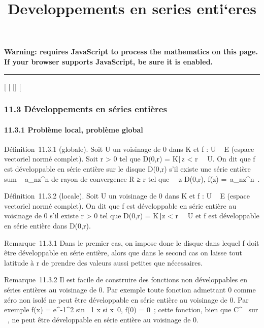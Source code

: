 \documentclass[]{article}
\title{Developpements en series enti`eres}
\author{}
\date{}
\begin{document}
\maketitle

\textbf{Warning: 
requires JavaScript to process the mathematics on this page.\\ If your
browser supports JavaScript, be sure it is enabled.}

\begin{center}\rule{3in}{0.4pt}\end{center}

[
[
[]
[

\subsubsection{11.3 Développements en séries entières}

\paragraph{11.3.1 Problème local, problème global}

Définition~11.3.1 (globale). Soit U un voisinage de 0 dans K et f : U \rightarrow~
E (espace vectoriel normé complet). Soit r > 0 tel que
D(0,r) = \z \in
K∣z <
r\ \subset~ U. On dit que f est développable en série entière
sur le disque D(0,r) s'il existe une série entière
\\sum ~
a_nz^n de rayon de convergence R ≥ r tel que
\forall~~z \in D(0,r), f(z) =\
\sum  a_nz^n~.

Définition~11.3.2 (locale). Soit U un voisinage de 0 dans K et f : U \rightarrow~ E
(espace vectoriel normé complet). On dit que f est développable en série
entière au voisinage de 0 s'il existe r > 0 tel que D(0,r)
= \z \in
K∣z <
r\ \subset~ U et f est développable en série entière dans
D(0,r).

Remarque~11.3.1 Dans le premier cas, on impose donc le disque dans
lequel f doit être développable en série entière, alors que dans le
second cas on laisse tout latitude à r de prendre des valeurs aussi
petites que nécessaires.

Remarque~11.3.2 Il est facile de construire des fonctions non
développables en séries entières au voisinage de 0. Par exemple toute
fonction admettant 0 comme zéro non isolé ne peut être développable en
série entière au voisinage de 0. Par exemple f(x) =
e^-1\diagupx^2  sin~  1
\over x si x\neq~0, f(0) = 0~;
cette fonction, bien que C^\infty~ sur ~, ne peut être développable
en série entière au voisinage de 0.
\end{document}
